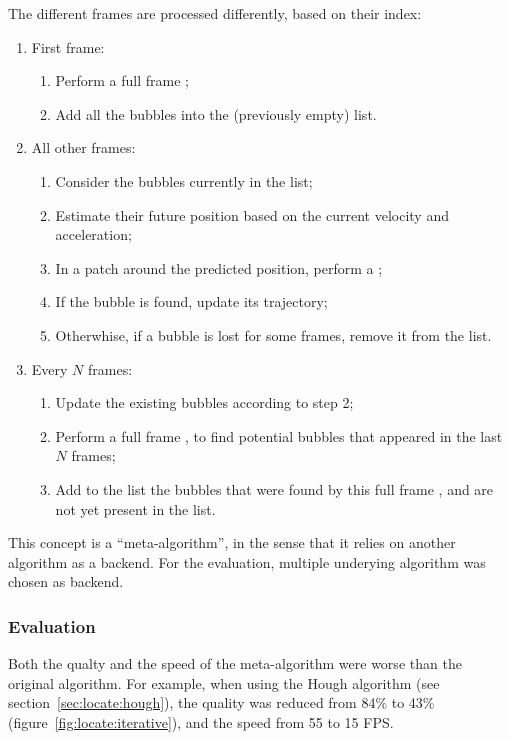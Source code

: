 The different frames are processed differently, based on their index:
\begin{enumerate}
	\itemsep 0em
	\item First frame:
	      \begin{enumerate}
		      \itemsep 0em
		      \item Perform a full frame \locate*;
		      \item Add all the bubbles into the (previously empty) list.
	      \end{enumerate}
	\item All other frames:
	      \begin{enumerate}
		      \itemsep 0em
		      \item Consider the bubbles currently in the list;
		      \item Estimate their future position based on the current velocity and acceleration;
		      \item In a patch around the predicted position, perform a \locate*;
		      \item If the bubble is found, update its trajectory;
		      \item Otherwhise, if a bubble is lost for some frames, remove it from the list.
	      \end{enumerate}
	\item Every $N$ frames:
	      \begin{enumerate}
		      \itemsep 0em
		      \item Update the existing bubbles according to step 2;
		      \item Perform a full frame \locate*, to find potential bubbles that appeared in the last $N$ frames;
		      \item Add to the list the bubbles that were found by this full frame \locate*, and are not yet present in the list.
	      \end{enumerate}
\end{enumerate}

This concept is a ``meta-algorithm'', in the sense that it relies on another \locate* algorithm as a backend.
For the evaluation, multiple underying algorithm was chosen as backend.

\subsubsection{Evaluation}

Both the qualty and the speed of the meta-algorithm were worse than the original algorithm.
For example, when using the Hough algorithm (see section~\ref{sec:locate:hough}), the quality was reduced from 84\% to 43\% (figure~\ref{fig:locate:iterative}), and the speed from 55 to 15 FPS.

